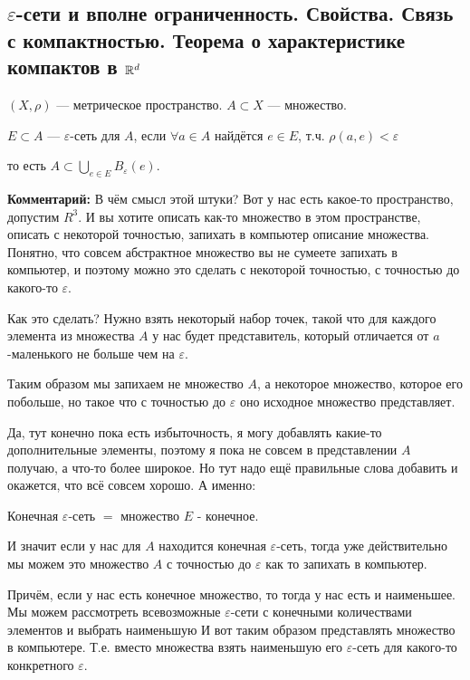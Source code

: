 \subsection{$\varepsilon$-сети и вполне ограниченность. Свойства. Связь с компактностью. Теорема о характеристике компактов в $\mathbb{R}^d$ \href{https://youtu.be/IwHCWoW4oes?t=5735}{\Walley}}

\begin{conj}
    $(X, \rho)$ --- метрическое пространство. $A \subset X$ --- множество.

    $E \subset A$ --- $\varepsilon$-сеть для $A$, если $\forall a \in A$ найдётся $e \in E$, т.ч. $\rho(a, e) < \varepsilon$

    то есть $A \subset \bigcup\limits_{e \in E} B_{\varepsilon}(e)$.

\end{conj}

\textbf{Комментарий:}
В чём смысл этой штуки?
Вот у нас есть какое-то пространство, допустим $R^3$.
И вы хотите описать как-то множество в этом пространстве,
описать с некоторой точностью, запихать в компьютер описание множества.
Понятно, что совсем абстрактное множество вы не сумеете запихать в компьютер,
и поэтому можно это сделать с некоторой точностью,
с точностью до какого-то $\varepsilon$. 

Как это сделать? Нужно взять некоторый набор точек,
такой что для каждого элемента из множества $A$ у нас будет представитель, который
отличается от $a$-маленького не больше чем на $\varepsilon$.

Таким образом мы запихаем не множество $A$, а некоторое множество, которое его побольше, но такое что с точностью до
$\varepsilon$ оно исходное множество представляет.

Да, тут конечно пока есть избыточность, я могу добавлять какие-то дополнительные элементы, поэтому я пока не совсем в представлении $A$ получаю, а что-то более широкое.
Но тут надо ещё правильные слова добавить и окажется, что всё совсем хорошо.
А именно:

\begin{conj}
    Конечная $\varepsilon$-сеть $=$ множество $E$ - конечное. 
\end{conj}

И значит если у нас для $A$ находится конечная $\varepsilon$-сеть, тогда уже действительно мы можем это множество $A$ с точностью до $\varepsilon$ как то запихать в компьютер.

Причём, если у нас есть конечное множество, то тогда у нас есть и наименьшее.
Мы можем рассмотреть всевозможные $\varepsilon$-сети с конечными количествами элементов и выбрать наименьшую
И вот таким образом представлять множество в компьютере. Т.е. вместо множества взять наименьшую его $\varepsilon$-сеть для какого-то конкретного $\varepsilon$.

